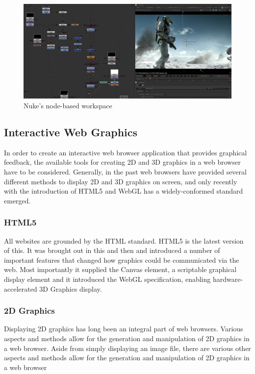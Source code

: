 \documentclass[a4paper,11pt,titlepage]{article}
\begin{document}
\begin{figure}[ht!]
\centering
\includegraphics[width=170mm]{graphics/nuke_02.png}
\caption{Nuke's node-based workspace}
\label{fig:UIdesign1}
\end{figure}


\subsection{Interactive Web Graphics}

In order to create an interactive web browser application that provides graphical feedback, the available tools for creating 2D and 3D graphics in a web browser have to be considered. Generally, in the past web browsers have provided several different methods to display 2D and 3D graphics on screen, and only recently with the introduction of HTML5 and WebGL has a widely-conformed standard emerged.

\subsubsection{HTML5}

All websites are grounded by the HTML standard. HTML5 is the latest version of this. It was brought out in this and then and introduced a number of important features that changed how graphics could be communicated via the web. Most importantly it supplied the Canvas element, a scriptable graphical display element and it introduced the WebGL specification, enabling hardware-accelerated 3D Graphics display.


\subsubsection{2D Graphics}

Displaying 2D graphics has long been an integral part of web browsers. Various aspects and methods allow for the generation and manipulation of 2D graphics in a web browser. Aside from simply displaying an image file, there are various other aspects and methods allow for the generation and manipulation of 2D graphics in a web browser
\end{document}
